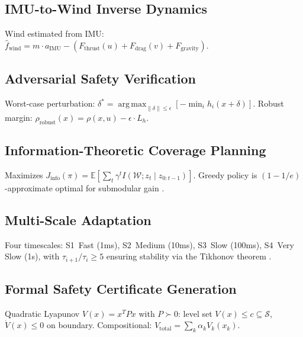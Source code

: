 \documentclass[11pt,twocolumn]{article}
\theoremstyle{definition}
\newcommand{\EE}{\mathbb{E}}
\newcommand{\cS}{\mathcal{S}}
\newcommand{\cW}{\mathcal{W}}
\DeclareMathOperator*{\argmax}{arg\,max}
\begin{document}
\subsection{IMU-to-Wind Inverse Dynamics}
\label{sec:inverse_dynamics}
Wind estimated from IMU: $\hat{f}_{\text{wind}} = m \cdot a_{\text{IMU}} - (F_{\text{thrust}}(u) + F_{\text{drag}}(v) + F_{\text{gravity}})$.

\subsection{Adversarial Safety Verification}
\label{sec:adversarial}
Worst-case perturbation: $\delta^* = \argmax_{\|\delta\| \leq \epsilon}[-\min_i h_i(x + \delta)]$. Robust margin: $\rho_{\text{robust}}(x) = \rho(x, u) - \epsilon \cdot L_h$.

\subsection{Information-Theoretic Coverage Planning}
\label{sec:info_planning}
Maximizes $J_{\text{info}}(\pi) = \EE[\sum_t \gamma^t I(\cW; z_t \mid z_{0:t-1})]$. Greedy policy is $(1-1/e)$-approximate optimal for submodular gain \citep{Krause2008}.

\subsection{Multi-Scale Adaptation}
\label{sec:multiscale}
Four timescales: S1~Fast (1ms), S2~Medium (10ms), S3~Slow (100ms), S4~Very Slow (1s), with $\tau_{i+1}/\tau_i \geq 5$ ensuring stability via the Tikhonov theorem \citep{Khalil2002}.

\subsection{Formal Safety Certificate Generation}
\label{sec:formal}
Quadratic Lyapunov $V(x) = x^T P x$ with $P \succ 0$: level set $V(x) \leq c \subseteq \cS$, $\dot{V}(x) \leq 0$ on boundary. Compositional: $V_{\text{total}} = \sum_k \alpha_k V_k(x_k)$.
\end{document}
